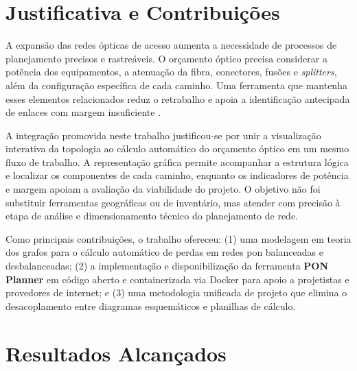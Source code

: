 \section{Justificativa e Contribuições}

A expansão das redes ópticas de acesso aumenta a necessidade de processos de planejamento precisos e rastreáveis. O orçamento óptico precisa considerar a potência dos equipamentos, a atenuação da fibra, conectores, fusões e \textit{splitters}, além da configuração específica de cada caminho. Uma ferramenta que mantenha esses elementos relacionados reduz o retrabalho e apoia a identificação antecipada de enlaces com margem insuficiente \cite{keiser2011pon,oliviero2014fiber}.

A integração promovida neste trabalho justificou-se por unir a visualização interativa da topologia ao cálculo automático do orçamento óptico em um mesmo fluxo de trabalho. A representação gráfica permite acompanhar a estrutura lógica e localizar os componentes de cada caminho, enquanto os indicadores de potência e margem apoiam a avaliação da viabilidade do projeto. O objetivo não foi substituir ferramentas geográficas ou de inventário, mas atender com precisão à etapa de análise e dimensionamento técnico do planejamento de rede.

Como principais contribuições, o trabalho ofereceu: (1) uma modelagem em teoria dos grafos para o cálculo automático de perdas em redes \gls{pon} balanceadas e desbalanceadas; (2) a implementação e disponibilização da ferramenta \textbf{PON Planner} em código aberto e containerizada via Docker para apoio a projetistas e provedores de internet; e (3) uma metodologia unificada de projeto que elimina o desacoplamento entre diagramas esquemáticos e planilhas de cálculo.

\section{Resultados Alcançados}

